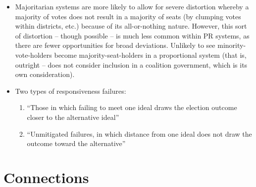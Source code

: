 \documentclass[12pt]{article}
\begin{document}
\begin{itemize}[leftmargin=*, itemsep=4pt]
    \item Majoritarian systems are more likely to allow for severe distortion whereby a majority of votes does not result in a majority of seats (by clumping votes within districts, etc.) because of its all-or-nothing nature. However, this sort of distortion -- though possible -- is much less common within PR systems, as there are fewer opportunities for broad deviations. Unlikely to see minority-vote-holders become majority-seat-holders in a proportional system (that is, outright -- does not consider inclusion in a coalition government, which is its own consideration).
    \item Two types of responsiveness failures:
    \begin{enumerate}
        \item ``Those in which failing to meet one ideal draws the election outcome closer to the alternative ideal''
        \item ``Unmitigated failures, in which distance from one ideal does not draw the outcome toward the alternative''
    \end{enumerate}
\end{itemize}


\section{Connections}
\end{document}
